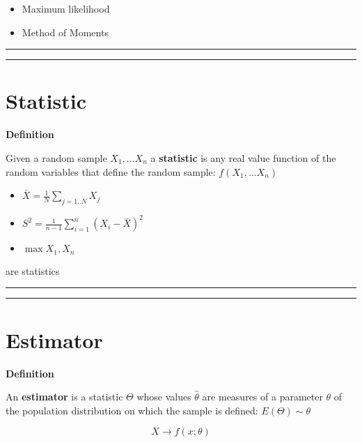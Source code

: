 \documentclass[
]{book}
\providecommand{\tightlist}{%
  \setlength{\itemsep}{0pt}\setlength{\parskip}{0pt}}
\begin{document}
\begin{itemize}
\tightlist
\item
  Maximum likelihood
\item
  Method of Moments
\end{itemize}

\begin{center}\rule{0.5\linewidth}{0.5pt}\end{center}

\begin{center}\rule{0.5\linewidth}{0.5pt}\end{center}

\hypertarget{statistic-1}{%
\section{Statistic}\label{statistic-1}}

\textbf{Definition}

Given a random sample \(X_1,...X_n\) a \textbf{statistic} is any real value function of the random variables that define the random sample: \(f(X_1,...X_n)\)

\begin{itemize}
\tightlist
\item
  \(\bar{X}=\frac{1}{N} \sum_{j=1..N} X_j\)
\item
  \(S^2=\frac{1}{n-1}\sum_{i=1}^n (X_i-\bar{X})^2\)
\item
  \(\max{X_1, X_n}\)
\end{itemize}

are statistics

\begin{center}\rule{0.5\linewidth}{0.5pt}\end{center}

\begin{center}\rule{0.5\linewidth}{0.5pt}\end{center}

\hypertarget{estimator}{%
\section{Estimator}\label{estimator}}

\textbf{Definition}

An \textbf{estimator} is a statistic \(\Theta\) whose values \(\hat{\theta}\) are measures of a parameter \(\theta\) of the population distribution on which the sample is defined: \(E(\Theta)\sim \theta\)

\[X \rightarrow f(x; \theta)\]
\end{document}
